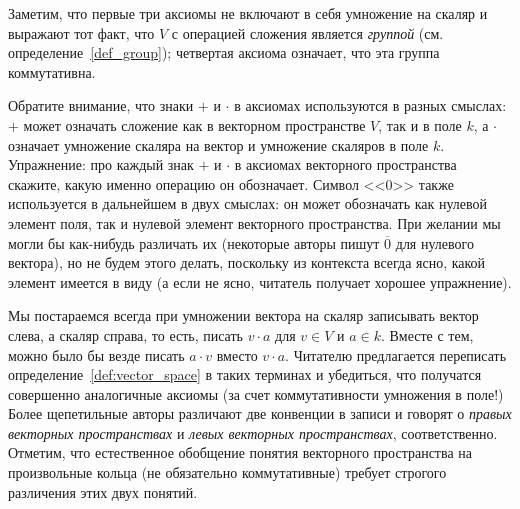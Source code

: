 \begin{remark}
Заметим, что первые три аксиомы не включают в себя умножение на скаляр
и выражают тот факт, что $V$ с операцией сложения является {\em
  группой} (см. определение~\ref{def_group}); четвертая аксиома
означает, что эта группа коммутативна.
\end{remark}
\begin{remark}
Обратите внимание, что знаки $+$ и $\cdot$ в аксиомах используются в
разных смыслах: $+$ может означать сложение как в векторном
пространстве $V$, так и в поле $k$, а $\cdot$ означает умножение
скаляра на вектор и умножение скаляров в поле $k$. Упражнение:
про каждый знак $+$ и $\cdot$ в аксиомах векторного пространства
скажите, какую именно операцию он обозначает.
Символ <<$0$>> также используется в дальнейшем в двух смыслах: он может
обозначать как нулевой элемент поля, так и нулевой элемент векторного
пространства. При желании мы могли бы как-нибудь различать их (некоторые
авторы пишут $\overline{0}$ для нулевого вектора), но
не будем этого делать, поскольку из контекста всегда ясно, какой
элемент имеется в виду (а если не ясно, читатель получает
хорошее упражнение).
\end{remark}
\begin{remark}
Мы постараемся всегда при умножении вектора на скаляр записывать
вектор слева, а скаляр справа, то есть, писать $v\cdot a$ для $v\in V$
и $a\in k$. Вместе с тем, можно было бы везде писать $a\cdot v$
вместо $v\cdot a$. Читателю предлагается переписать
определение~\ref{def:vector_space} в таких терминах и убедиться, что
получатся совершенно аналогичные аксиомы (за счет коммутативности
умножения в поле!) Более щепетильные авторы различают две конвенции
в записи и говорят о {\em правых векторных пространствах}
и {\em левых векторных пространствах}, соответственно.
Отметим, что естественное обобщение понятия векторного пространства
на произвольные кольца (не обязательно коммутативные) требует
строгого различения этих двух понятий.
\end{remark}


